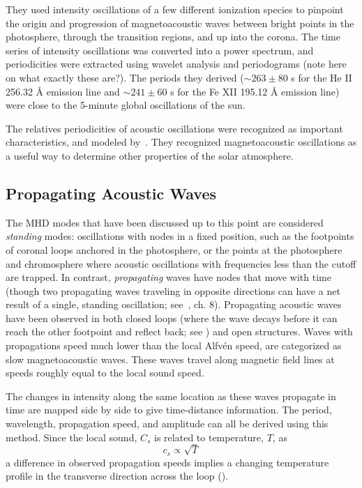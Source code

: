 \documentclass[preprint2]{aastex}
\begin{document}
They used intensity oscillations of a few different ionization
species to pinpoint the origin and progression of magnetoacoustic waves
between bright points in the photosphere, through the transition regions,
and up into the corona. The time series of intensity oscillations was
converted into a power spectrum, and periodicities were extracted using
wavelet analysis and periodograms (note here on what exactly these are?).
The periods they derived
($\sim 263 \pm 80$ s for the He II 256.32 \AA{} emission line and
$\sim 241 \pm 60$ s for the Fe XII 195.12 \AA{}  emission line)
were close to the 5-minute global oscillations of the sun.

The relatives periodicities of acoustic oscillations were recognized
as important characteristics, and modeled by~\cite{acoustic_1}.
They recognized magnetoacoustic oscillations as a useful way to determine
other properties of the solar atmosphere.
\subsection{Propagating Acoustic Waves}
The MHD modes that have been discussed up to this point are considered
\emph{standing} modes: oscillations with nodes in a fixed
position, such as the footpoints of coronal loops anchored in
the photosphere, or the points at the photosphere and chromosphere where
acoustic oscillations with frequencies less than the cutoff are trapped.
In contrast, \emph{propagating} waves have nodes that move with time
(though two propagating waves traveling in opposite directions can
have a net result of a single, standing oscillation; see~\cite{Asc},
ch. 8).
Propagating acoustic waves have been observed in both closed loops
(where the wave decays before it can reach the other footpoint
and reflect back; see {\cite{acoustic_1}})
and open structures.
Waves with propagations speed much lower than the
local Alfv\'en speed, are categorized as slow magnetoacoustic waves.
These waves travel along magnetic field lines at speeds roughly equal to
the local sound speed.

The changes in intensity along the same location as these waves
propagate in time are mapped side by side to give time-distance
information. The period, wavelength, propagation speed, and amplitude
can all be derived using this method.
Since the local sound, $C_{s}$ is related to temperature, $T$, as
\begin{equation}\label{sound-temp}
 c_{s} \propto \sqrt{T}
\end{equation}
a difference in observed propagation speeds implies a changing
temperature profile in the transverse direction across the loop
(\cite{Nak}).
\end{document}
